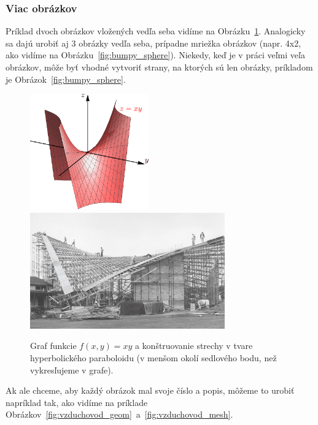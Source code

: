 \subsubsection{Viac obrázkov}

Príklad dvoch obrázkov vložených vedľa seba vidíme na Obrázku~\ref{fig:hyperbolicky_paraboloid}. Analogicky sa dajú urobiť aj 3 obrázky vedľa seba, prípadne mriežka obrázkov (napr. 4x2, ako vidíme na Obrázku~\ref{fig:bumpy_sphere}). Niekedy, keď je v práci veľmi veľa obrázkov, môže byť vhodné vytvoriť strany, na ktorých sú len obrázky, príkladom je Obrázok~\ref{fig:bumpy_sphere}.
\begin{figure}[h!]
	\centering
	\includegraphics[height=5cm]{fig_hyperbolicky_paraboloid}
	\quad
	\includegraphics[height=5cm]{st_chas_framing}
	\caption{Graf funkcie $f(x,y)=xy$ a konštruovanie strechy v tvare hyperbolického paraboloidu (v menšom okolí sedlového bodu, než vykresľujeme v grafe).} \label{fig:hyperbolicky_paraboloid}
\end{figure}
Ak ale chceme, aby každý obrázok mal svoje číslo a popis, môžeme to urobiť napríklad tak, ako vidíme na príklade Obrázkov~\ref{fig:vzduchovod_geom}~a~\ref{fig:vzduchovod_mesh}.
